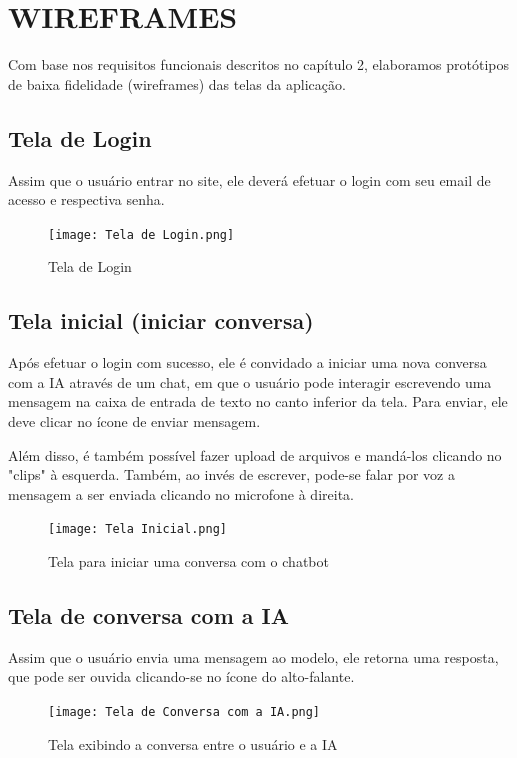 \documentclass[
	12pt,				%
	openright,			%
	oneside,			    %
	a4paper,				%
	english,			%
	french,			%
	spanish,			%
	brazil			%
	]{abntex2}
\begin{document}
\chapter{WIREFRAMES} %
Com base nos requisitos funcionais descritos no capítulo 2, elaboramos protótipos de baixa fidelidade (wireframes) das telas da aplicação.

\section{Tela de Login}
Assim que o usuário entrar no site, ele deverá efetuar o login com seu email de acesso e respectiva senha.

\begin{figure}[h]
    \centering
    \texttt{[image: Tela de Login.png]}
    \caption{Tela de Login}
    \label{fig:enter-label}
\end{figure}

\section{Tela inicial (iniciar conversa)}
Após efetuar o login com sucesso, ele é convidado a iniciar uma nova conversa com a IA através de um chat, em que o usuário pode interagir escrevendo uma mensagem na caixa de entrada de texto no canto inferior da tela. Para enviar, ele deve clicar no ícone de enviar mensagem. 

Além disso, é também possível fazer upload de arquivos e mandá-los clicando no "clips" à esquerda. Também, ao invés de escrever, pode-se falar por voz a mensagem a ser enviada clicando no microfone à direita.

\begin{figure}[h]
    \centering
    \texttt{[image: Tela Inicial.png]}
    \caption{Tela para iniciar uma conversa com o chatbot}
    \label{fig:enter-label}
\end{figure}

\section{Tela de conversa com a IA}
Assim que o usuário envia uma mensagem ao modelo, ele retorna uma resposta, que pode ser ouvida clicando-se no ícone do alto-falante.

\begin{figure}[h]
    \centering
    \texttt{[image: Tela de Conversa com a IA.png]}
    \caption{Tela exibindo a conversa entre o usuário e a IA}
    \label{fig:enter-label}
\end{figure}
\end{document}
